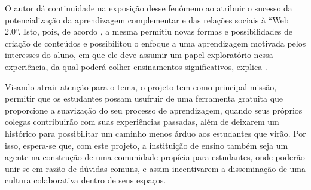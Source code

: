 O autor dá continuidade na exposição desse fenômeno ao atribuir o sucesso da potencialização da aprendizagem complementar e das relações sociais à ``Web 2.0''. Isto, pois, de acordo , a mesma permitiu novas formas e possibilidades de criação de conteúdos e possibilitou o enfoque a uma aprendizagem motivada pelos interesses do aluno, em que ele deve assumir um papel exploratório nessa experiência, da qual poderá colher ensinamentos significativos, explica .

Visando atrair atenção para o tema, o projeto tem como principal missão, permitir que os estudantes possam usufruir de uma ferramenta gratuita que proporcione a suavização do seu processo de aprendizagem, quando seus próprios colegas contribuirão com suas experiências passadas, além de deixarem um histórico para possibilitar um caminho menos árduo aos estudantes que virão. Por isso, espera-se que, com este projeto, a instituição de ensino também seja um agente na construção de uma comunidade propícia para estudantes, onde poderão unir-se em razão de dúvidas comuns, e assim incentivarem a disseminação de uma cultura colaborativa dentro de seus espaços.


